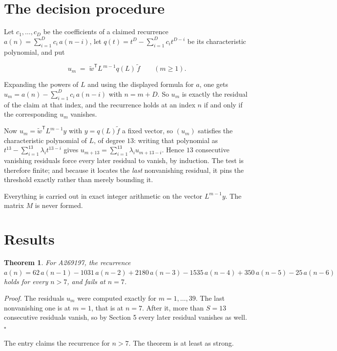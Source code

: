 \documentclass[11pt]{article}
\newtheorem{theorem}{Theorem}
\theoremstyle{definition}
\begin{document}
\section{The decision procedure}

Let $c_1,\dots,c_D$ be the coefficients of a claimed recurrence $a(n) = \sum_{i=1}^{D} c_i\,a(n-i)$, let $q(t) = t^{D} - \sum_{i=1}^{D} c_i t^{D-i}$ be its characteristic polynomial, and put

\[u_m \;=\; \tilde w^{\mathsf T} L^{\,m-1} q(L)\,\tilde f \qquad (m \ge 1).\]

Expanding the powers of $L$ and using the displayed formula for $a$, one gets $u_m = a(n) - \sum_{i=1}^{D} c_i\,a(n-i)$ with $n = m + D$. So $u_m$ is exactly the residual of the claim at that index, and the recurrence holds at an index $n$ if and only if the corresponding $u_m$ vanishes.

Now $u_m = \tilde w^{\mathsf T} L^{m-1} y$ with $y = q(L)\tilde f$ a fixed vector, so $(u_m)$ satisfies the characteristic polynomial of $L$, of degree $13$: writing that polynomial as $t^{13} - \sum_{i=1}^{13} \lambda_i t^{13-i}$ gives $u_{m+13} = \sum_{i=1}^{13} \lambda_i u_{m+13-i}$. Hence $13$ consecutive vanishing residuals force every later residual to vanish, by induction. The test is therefore finite; and because it locates the {\itshape last} nonvanishing residual, it pins the threshold exactly rather than merely bounding it.

Everything is carried out in exact integer arithmetic on the vector $L^{m-1}y$. The matrix $M$ is never formed.

\section{Results}

\begin{theorem} For A269197, the recurrence $a(n) = 62\,a(n-1) - 1031\,a(n-2) + 2180\,a(n-3) - 1535\,a(n-4) + 350\,a(n-5) - 25\,a(n-6)$ holds for every $n > 7$, and fails at $n = 7$.\end{theorem}

{\itshape Proof.} The residuals $u_m$ were computed exactly for $m = 1,\dots,39$. The last nonvanishing one is at $m = 1$, that is at $n = 7$. After it, more than $S = 13$ consecutive residuals vanish, so by Section 5 every later residual vanishes as well. $\square$

The entry claims the recurrence for $n > 7$. The theorem is at least as strong.
\end{document}
